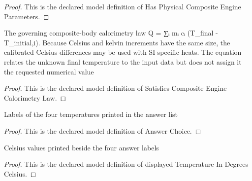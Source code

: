 \begin{proof}
  This is the declared model definition of Has Physical Composite Engine Parameters.
\end{proof}
\begin{definition}
  \label{def:physics:phyx-mini-0456:phyxminiproblems-problemphyxmini0456-satisfiescompositeenginecalorimetrylaw}
  The governing composite-body calorimetry law Q = ∑ᵢ mᵢ cᵢ (T\_final - T\_initial,i). Because Celsius and kelvin increments have the same size, the calibrated Celsius differences may be used with SI specific heats. The equation relates the unknown final temperature to the input data but does not assign it the requested numerical value
\end{definition}
\begin{proof}
  This is the declared model definition of Satisfies Composite Engine Calorimetry Law.
\end{proof}
\begin{definition}
  \label{def:physics:phyx-mini-0456:phyxminiproblems-problemphyxmini0456-answerchoice}
  Labels of the four temperatures printed in the answer list
\end{definition}
\begin{proof}
  This is the declared model definition of Answer Choice.
\end{proof}
\begin{definition}
  \label{def:physics:phyx-mini-0456:phyxminiproblems-problemphyxmini0456-displayedtemperatureindegreescelsius}
  Celsius values printed beside the four answer labels
\end{definition}
\begin{proof}
  This is the declared model definition of displayed Temperature In Degrees Celsius.
\end{proof}
